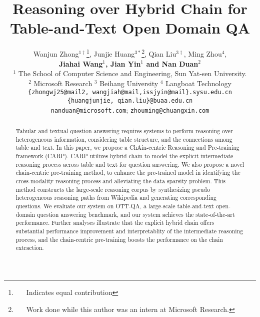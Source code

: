 \documentclass[11pt]{article}
\title{Reasoning over Hybrid Chain for Table-and-Text Open Domain QA}
\author{Wanjun Zhong$^{1\dag}$\thanks{\ \ \ Indicates equal contribution}, Junjie Huang$^{3*}$\thanks{\ \ \ Work done while this author was an intern at Microsoft Research.}, Qian Liu$^{3\dag}$, Ming Zhou$^4$,\\ \textbf{Jiahai Wang$^1$, Jian Yin$^1$ and Nan Duan$^2$} \\
	$^1$ The School of Computer Science and Engineering, Sun Yat-sen University.\\
	$^2$ Microsoft Research \quad $^3$ Beihang University \quad $^4$ Langboat Technology\\
	{\tt \{zhongwj25@mail2, wangjiah@mail,issjyin@mail\}.sysu.edu.cn}\\
	{\tt \{huangjunjie, qian.liu\}@buaa.edu.cn} \\
	{\tt nanduan@microsoft.com}; \tt zhouming@chuangxin.com\\ 
}
\begin{document}
	\maketitle
	\begin{abstract}
Tabular and textual question answering requires systems to perform reasoning over heterogeneous information, considering table structure, and the connections among table and text. In this paper, we propose a ChAin-centric Reasoning and Pre-training framework (CARP). CARP utilizes hybrid chain to model the explicit intermediate reasoning process across table and text for question answering. We also propose a novel chain-centric pre-training method, to enhance the pre-trained model in identifying the cross-modality reasoning process and alleviating the data sparsity problem. This method constructs the large-scale reasoning corpus by synthesizing pseudo heterogeneous reasoning paths from Wikipedia and generating corresponding questions. We evaluate our system on OTT-QA, a large-scale table-and-text open-domain question answering benchmark, and our system achieves the state-of-the-art performance. Further analyses illustrate that the explicit hybrid chain offers substantial performance improvement and interpretablity of the intermediate reasoning process, and the chain-centric pre-training boosts the performance on the chain extraction.


		
		
	\end{abstract}
	\iffalse
	\begin{abstract}
		Tabular and textual open-domain multi-hop question answering requires systems to retrieve knowledge from both tabular and textual corpus, and perform multi-hop reasoning to aggregate hybrid information to derive an answer.
		In this paper, we propose a ChAin-centric Reasoning and Pre-training approach (CARP) to model the explicit intermediate reasoning process for question answering.
CARP utilizes hybrid chain, the fine-grained reasoning path across two modalities, as the intermediate state for downstream question answering.
We also propose a chain-centric pre-training task to enhance the model in identifying the relevant chains, and a novel way to sythesize the large-scale pre-training corpus by reversely generating questions from the pseudo hybrid chains constructed from Wikipedia corpus containing both tables and passages.
We evaluate our system on OTT-QA, a large-scale tabular and textual open-domain question answering dataset, and our system achieves the state-of-the-art performance.
Further analyses illustrate that the explicit hybrid chain offers substantial performance improvement and interpretable explanation of the intermediate reasoning process, and the chain-centric pre-training boosts the performance on the hybrid chain extraction.~\footnote{We will release our code and data upon acceptance.}


		
	\end{abstract}
	\fi
	
\end{document}
